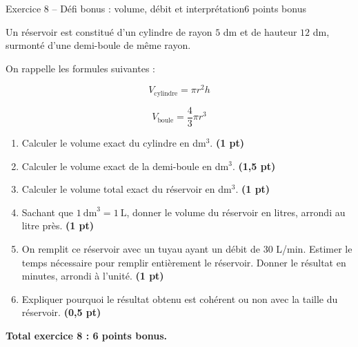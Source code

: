 \documentclass[11pt,a4paper]{article}
\newcommand{\pts}[1]{\hfill \textbf{(#1 pt)}}
\begin{document}
\begin{exercicebox}{Exercice 8 -- Défi bonus : volume, débit et interprétation}{6 points bonus}

Un réservoir est constitué d’un cylindre de rayon $5$ dm et de hauteur $12$ dm, surmonté d’une demi-boule de même rayon.

On rappelle les formules suivantes :

\[
V_{\text{cylindre}}=\pi r^2h
\]

\[
V_{\text{boule}}=\frac{4}{3}\pi r^3
\]

\begin{enumerate}
    \item Calculer le volume exact du cylindre en dm$^3$. \pts{1}

    \item Calculer le volume exact de la demi-boule en dm$^3$. \pts{1,5}

    \item Calculer le volume total exact du réservoir en dm$^3$. \pts{1}

    \item Sachant que $1\ \text{dm}^3=1\ \text{L}$, donner le volume du réservoir en litres, arrondi au litre près. \pts{1}

    \item On remplit ce réservoir avec un tuyau ayant un débit de $30$ L/min. Estimer le temps nécessaire pour remplir entièrement le réservoir. Donner le résultat en minutes, arrondi à l’unité. \pts{1}

    \item Expliquer pourquoi le résultat obtenu est cohérent ou non avec la taille du réservoir. \pts{0,5}
\end{enumerate}

\textbf{Total exercice 8 : 6 points bonus.}

\end{exercicebox}
\end{document}

